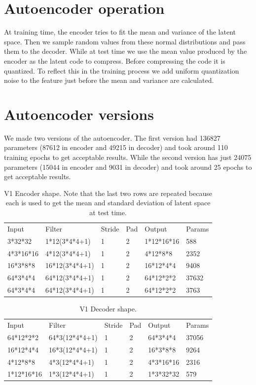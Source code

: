 \documentclass[10pt]{article}
\begin{document}
\section{Autoencoder operation}
At training time, the encoder tries to fit the mean and variance of the latent space. Then we sample random values from these normal distributions and pass them to the decoder. While at test time we use the mean value produced by the encoder as the latent code to compress. Before compressing the code it is quantized. To reflect this in the training process we add uniform quantization noise to the feature just before the mean and variance are calculated.

\section{Autoencoder versions}
We made two versions of the autoencoder. The first version had 136827 parameters (87612 in encoder and 49215 in decoder) and took around 110 training epochs to get acceptable results. While the second version has just 24075 parameters (15044 in encoder and 9031 in decoder) and took around 25 epochs to get acceptable results.

\begin{table}
\begin{tabular}{|l|l|l|l|l|l|}
Input & Filter & Stride & Pad & Output & Params\\
3*32*32		&1*12(3*4*4+1)		&1	&2	&1*12*16*16	&588\\
4*3*16*16	&4*12(3*4*4+1)		&1	&2	&4*12*8*8		&2352\\
16*3*8*8	&16*12(3*4*4+1)	&1	&2	&16*12*4*4	&9408\\
64*3*4*4	&64*12(3*4*4+1)	&1	&2	&64*12*2*2	&37632\\
64*3*4*4	&64*12(3*4*4+1)	&1	&2	&64*12*2*2	&3763\\
\end{tabular}
\caption{\label{tab:table-name}V1 Encoder shape. Note that the last two rows are repeated because each is used to get the mean and standard deviation of latent space at test time.}
\end{table}

\begin{table}
\begin{tabular}{|l|l|l|l|l|l|}
Input & Filter & Stride & Pad & Output & Params\\
64*12*2*2		&64*3(12*4*4+1)	&1	&2	&64*3*4*4		&37056\\
16*12*4*4		&16*3(12*4*4+1)	&1	&2	&16*3*8*8		&9264\\
4*12*8*8		&4*3(12*4*4+1)		&1	&2	&4*3*16*16	&2316\\
1*12*16*16	&1*3(12*4*4+1)		&1	&2	&1*3*32*32	&579\\
\end{tabular}
\caption{\label{tab:table-name}V1 Decoder shape.}
\end{table}
\end{document}
